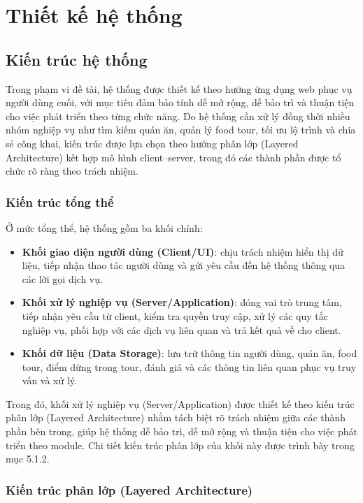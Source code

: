 \section{Thiết kế hệ thống}
\subsection{Kiến trúc hệ thống}
Trong phạm vi đề tài, hệ thống được thiết kế theo hướng ứng dụng web phục vụ người dùng cuối, với mục tiêu đảm bảo tính dễ mở rộng, dễ bảo trì và thuận tiện cho việc phát triển theo từng chức năng. Do hệ thống cần xử lý đồng thời nhiều nhóm nghiệp vụ như tìm kiếm quán ăn, quản lý food tour, tối ưu lộ trình và chia sẻ công khai, kiến trúc được lựa chọn theo hướng phân lớp (Layered Architecture) kết hợp mô hình client–server, trong đó các thành phần được tổ chức rõ ràng theo trách nhiệm.

\subsubsection{Kiến trúc tổng thể}
Ở mức tổng thể, hệ thống gồm ba khối chính:

\begin{itemize}[label=\textbullet]
    \item \textbf{Khối giao diện người dùng (Client/UI)}: chịu trách nhiệm hiển thị dữ liệu, tiếp nhận thao tác người dùng và gửi yêu cầu đến hệ thống thông qua các lời gọi dịch vụ.
    \item \textbf{Khối xử lý nghiệp vụ (Server/Application)}: đóng vai trò trung tâm, tiếp nhận yêu cầu từ client, kiểm tra quyền truy cập, xử lý các quy tắc nghiệp vụ, phối hợp với các dịch vụ liên quan và trả kết quả về cho client.
    \item \textbf{Khối dữ liệu (Data Storage)}: lưu trữ thông tin người dùng, quán ăn, food tour, điểm dừng trong tour, đánh giá và các thông tin liên quan phục vụ truy vấn và xử lý.
\end{itemize}

Trong đó, khối xử lý nghiệp vụ (Server/Application) được thiết kế theo kiến trúc phân lớp (Layered Architecture) nhằm tách biệt rõ trách nhiệm giữa các thành phần bên trong, giúp hệ thống dễ bảo trì, dễ mở rộng và thuận tiện cho việc phát triển theo module. Chi tiết kiến trúc phân lớp của khối này được trình bày trong mục 5.1.2.

\subsubsection{Kiến trúc phân lớp (Layered Architecture)}



